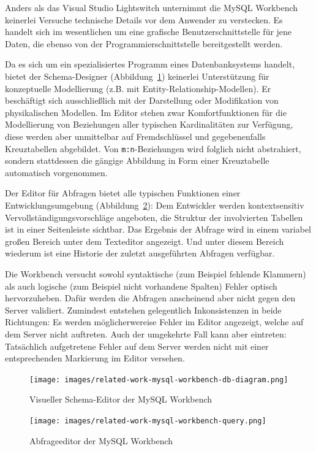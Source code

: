 Anders als das Visual Studio Lightswitch unternimmt die MySQL Workbench keinerlei Versuche technische Details vor dem Anwender zu verstecken. Es handelt sich im wesentlichen um eine grafische Benutzerschnittstelle für jene Daten, die ebenso von der Programmierschnittstelle bereitgestellt werden.

Da es sich um ein spezialisiertes Programm eines Datenbanksystems handelt, bietet der Schema-Designer (Abbildung~\ref{fig:mysql-workbench-schema-diagram}) keinerlei Unterstützung für konzeptuelle Modellierung (z.B. mit Entity-Relationship-Modellen). Er beschäftigt sich ausschließlich mit der Darstellung oder Modifikation von physikalischen Modellen. Im Editor stehen zwar Komfortfunktionen für die Modellierung von Beziehungen aller typischen Kardinalitäten zur Verfügung, diese werden aber unmittelbar auf Fremdschlüssel und gegebenenfalls Kreuztabellen abgebildet. Von \texttt{m:n}-Beziehungen wird folglich nicht abstrahiert, sondern stattdessen die gängige Abbildung in Form einer Kreuztabelle automatisch vorgenommen.

Der Editor für Abfragen bietet alle typischen Funktionen einer Entwicklungsumgebung (Abbildung~\ref{fig:mysql-workbench-query}): Dem Entwickler werden kontextsensitiv Vervollständigungsvorschläge angeboten, die Struktur der involvierten Tabellen ist in einer Seitenleiste sichtbar. Das Ergebnis der Abfrage wird in einem variabel großen Bereich unter dem Texteditor angezeigt. Und unter diesem Bereich wiederum ist eine Historie der zuletzt ausgeführten Abfragen verfügbar.

Die Workbench versucht sowohl syntaktische (zum Beispiel fehlende Klammern) als auch logische (zum Beispiel nicht vorhandene Spalten) Fehler optisch hervorzuheben. Dafür werden die Abfragen anscheinend aber nicht gegen den Server validiert. Zumindest entstehen gelegentlich Inkonsistenzen in beide Richtungen: Es werden möglicherwereise Fehler im Editor angezeigt, welche auf dem Server nicht auftreten. Auch der umgekehrte Fall kann aber eintreten: Tatsächlich aufgetretene Fehler auf dem Server werden nicht mit einer entsprechenden Markierung im Editor versehen.

\begin{figure}[p]
  \centering \texttt{[image: images/related-work-mysql-workbench-db-diagram.png]}
  \caption{Visueller Schema-Editor der MySQL Workbench}
  \label{fig:mysql-workbench-schema-diagram}
\end{figure}

\begin{figure}[p]
  \centering \texttt{[image: images/related-work-mysql-workbench-query.png]}
  \caption{Abfrageeditor der MySQL Workbench}
  \label{fig:mysql-workbench-query}
\end{figure}

